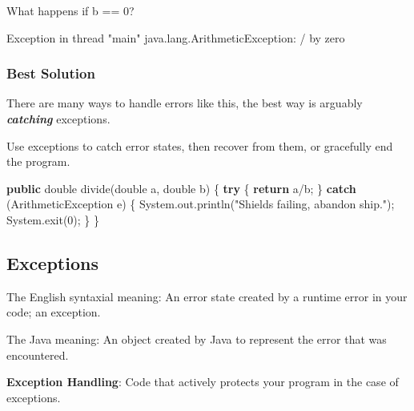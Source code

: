 \documentclass[]{article}
\newenvironment{Shaded}{}{}
\newcommand{\BuiltInTok}[1]{#1}
\newcommand{\DataTypeTok}[1]{\textcolor[rgb]{0.56,0.13,0.00}{#1}}
\newcommand{\DecValTok}[1]{\textcolor[rgb]{0.25,0.63,0.44}{#1}}
\newcommand{\FunctionTok}[1]{\textcolor[rgb]{0.02,0.16,0.49}{#1}}
\newcommand{\KeywordTok}[1]{\textcolor[rgb]{0.00,0.44,0.13}{\textbf{#1}}}
\newcommand{\NormalTok}[1]{#1}
\newcommand{\StringTok}[1]{\textcolor[rgb]{0.25,0.44,0.63}{#1}}
\begin{document}
What happens if b == 0?

\begin{Shaded}
\begin{Highlighting}[]
\BuiltInTok{Exception}\NormalTok{ in thread }\StringTok{"main"}\NormalTok{ java.}\FunctionTok{lang}\NormalTok{.}\FunctionTok{ArithmeticException}\NormalTok{: / by zero}
\end{Highlighting}
\end{Shaded}

\hypertarget{best-solution}{%
\subsubsection{Best Solution}\label{best-solution}}

There are many ways to handle errors like this, the best way is arguably
\textbf{\emph{catching}} exceptions.

Use exceptions to catch error states, then recover from them, or
gracefully end the program.

\begin{Shaded}
\begin{Highlighting}[]
\KeywordTok{public} \DataTypeTok{double} \FunctionTok{divide}\NormalTok{(}\DataTypeTok{double}\NormalTok{ a, }\DataTypeTok{double}\NormalTok{ b) \{}
    \KeywordTok{try}\NormalTok{ \{}
        \KeywordTok{return}\NormalTok{ a/b;}
\NormalTok{    \} }\KeywordTok{catch}\NormalTok{ (}\BuiltInTok{ArithmeticException}\NormalTok{ e) \{}
        \BuiltInTok{System}\NormalTok{.}\FunctionTok{out}\NormalTok{.}\FunctionTok{println}\NormalTok{(}\StringTok{"Shields failing, abandon ship."}\NormalTok{);}
        \BuiltInTok{System}\NormalTok{.}\FunctionTok{exit}\NormalTok{(}\DecValTok{0}\NormalTok{);}
\NormalTok{    \}}
\NormalTok{\}}
\end{Highlighting}
\end{Shaded}

\hypertarget{exceptions}{%
\subsection{Exceptions}\label{exceptions}}

The English syntaxial meaning: An error state created by a runtime error
in your code; an exception.

The Java meaning: An object created by Java to represent the error that
was encountered.

\textbf{Exception Handling}: Code that actively protects your program in
the case of exceptions.
\end{document}
